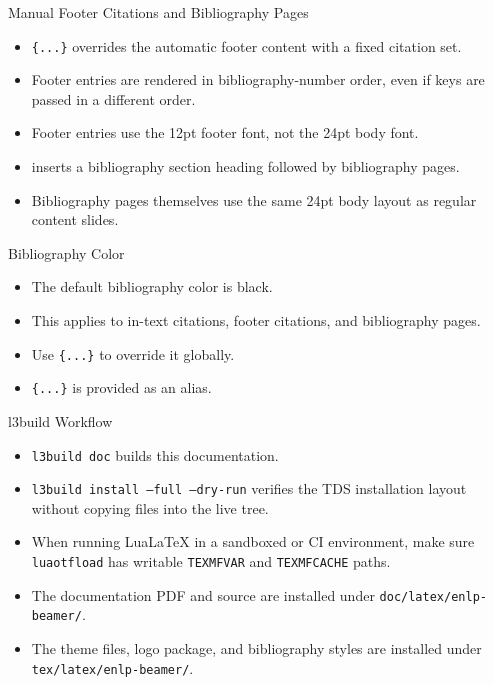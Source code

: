\documentclass[10pt]{beamer}
\begin{document}
\begin{frame}{Manual Footer Citations and Bibliography Pages}
  \begin{itemize}
    \item \texttt{\string\framefullcite\{...\}} overrides the automatic footer content with a fixed citation set.
    \item Footer entries are rendered in bibliography-number order, even if keys are passed in a different order.
    \item Footer entries use the 12pt footer font, not the 24pt body font.
    \item \texttt{\string\insertbibliographyframe} inserts a bibliography section heading followed by bibliography pages.
    \item Bibliography pages themselves use the same 24pt body layout as regular content slides.
  \end{itemize}
\end{frame}

\begin{frame}{Bibliography Color}
  \begin{itemize}
    \item The default bibliography color is black.
    \item This applies to in-text citations, footer citations, and bibliography pages.
    \item Use \texttt{\string\enlpsetbibliographycolor\{...\}} to override it globally.
    \item \texttt{\string\enlpsetcitecolor\{...\}} is provided as an alias.
  \end{itemize}
\end{frame}


\begin{frame}{l3build Workflow}
  \begin{itemize}
    \item \texttt{l3build doc} builds this documentation.
    \item \texttt{l3build install --full --dry-run} verifies the TDS installation layout without copying files into the live tree.
    \item When running LuaLaTeX in a sandboxed or CI environment, make sure \texttt{luaotfload} has writable \texttt{TEXMFVAR} and \texttt{TEXMFCACHE} paths.
    \item The documentation PDF and source are installed under \texttt{doc/latex/enlp-beamer/}.
    \item The theme files, logo package, and bibliography styles are installed under \texttt{tex/latex/enlp-beamer/}.
  \end{itemize}
\end{frame}
\end{document}
